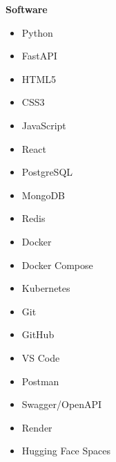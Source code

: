 \textbf{Software}

\begin{itemize}
\item Python
\item FastAPI
\item HTML5
\item CSS3
\item JavaScript
\item React
\item PostgreSQL
\item MongoDB
\item Redis
\item Docker
\item Docker Compose
\item Kubernetes
\item Git
\item GitHub
\item VS Code
\item Postman
\item Swagger/OpenAPI
\item Render
\item Hugging Face Spaces
\end{itemize}
